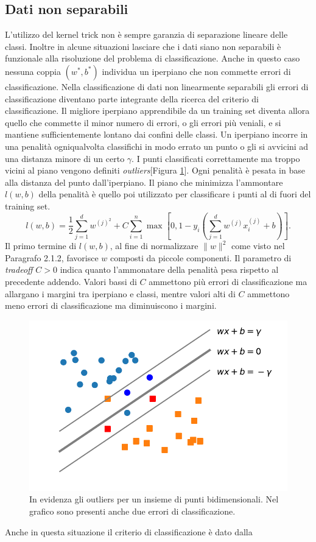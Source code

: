\documentclass [11pt,a4paper,twoside,openright] {book}
\begin{document}
\subsection{Dati non separabili}
L'utilizzo del kernel trick non è sempre garanzia di separazione lineare delle classi. Inoltre in alcune situazioni lasciare che i dati siano non separabili è funzionale alla risoluzione del problema di classificazione. Anche in questo caso nessuna coppia $(w^*,b^*)$ individua un iperpiano che non commette errori di classificazione. Nella classificazione di dati non linearmente separabili gli errori di classificazione diventano parte integrante della ricerca del criterio di classificazione. Il migliore iperpiano apprendibile da un training set diventa allora quello che commette il minor numero di errori, o gli errori più veniali, e si mantiene sufficientemente lontano dai confini delle classi. Un iperpiano incorre in una penalità ogniqualvolta classifichi in modo errato un punto o gli si avvicini ad una distanza minore di un certo $\gamma$. I punti classificati correttamente ma troppo vicini al piano vengono definiti \textit{outliers}[Figura \ref{outliers}]. Ogni penalità è pesata in base alla distanza del punto dall'iperpiano. Il piano che minimizza l'ammontare $l(w,b)$ della penalità è quello poi utilizzato per classificare i punti al di fuori del training set.
\begin{equation}
l(w,b)= \dfrac{1}{2} \sum_{j=1}^d w^{(j)^2} + C \sum_{i=1}^n \max[0, 1 - y_i(\sum_{j=1}^d w^{(j)} x_i^{(j)} + b)].
\end{equation}
Il primo termine di $l(w,b)$, al fine di normalizzare $\parallel w \parallel ^2$ come visto nel Paragrafo 2.1.2, favorisce $w$ composti da piccole componenti. Il parametro di \textit{tradeoff} $C > 0$ indica quanto l'ammonatare della penalità pesa rispetto al precedente addendo. Valori bassi di $C$ ammettono più errori di classificazione ma allargano i margini tra iperpiano e classi, mentre valori alti di $C$ ammettono meno errori di classificazione ma diminuiscono i margini.\\
\begin{figure}[!t]
\centering
\includegraphics[scale=.6]{figure/outliers.pdf}
\caption{In evidenza gli outliers per un insieme di punti bidimensionali. Nel grafico sono presenti anche due errori di classificazione. \label{outliers}}
\end{figure}Anche in questa situazione il criterio di classificazione è dato dalla
\end{document}
